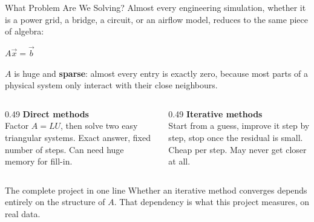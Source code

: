 \documentclass[aspectratio=169,10pt]{beamer}
\renewcommand{\emph}[1]{{\color{LSteal}\bfseries #1}}
\begin{document}
\begin{frame}{What Problem Are We Solving?}
  \small
  Almost every engineering simulation, whether it is a power grid, a bridge, a
  circuit, or an airflow model, reduces to the same piece of algebra:
  \begin{center}
  {\LARGE\color{LSnavy}\bfseries $A\vec{x} = \vec{b}$}
  \end{center}
  \vspace{0.3em}
  $A$ is huge and \emph{sparse}: almost every entry is exactly zero, because most
  parts of a physical system only interact with their close neighbours.
  \vspace{0.5em}
  \begin{columns}[T]
    \begin{column}{0.49\textwidth}
      \textbf{\color{LSteal}Direct methods}\\[0.2em]
      \footnotesize Factor $A = LU$, then solve two easy triangular systems.
      Exact answer, fixed number of steps. Can need huge memory for fill-in.
    \end{column}
    \begin{column}{0.49\textwidth}
      \textbf{\color{LSteal}Iterative methods}\\[0.2em]
      \footnotesize Start from a guess, improve it step by step, stop once the
      residual is small. Cheap per step. May never get closer at all.
    \end{column}
  \end{columns}
  \vspace{0.6em}
  \begin{block}{\small The complete project in one line}
    \footnotesize Whether an iterative method converges depends entirely on the
    structure of $A$. That dependency is what this project measures, on real data.
  \end{block}
\end{frame}
\end{document}
